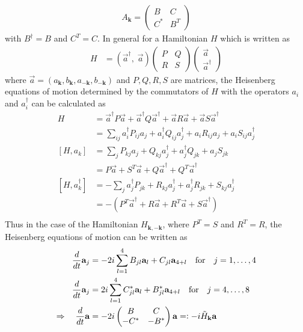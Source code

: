 \begin{align*}
    A_\mathbf{k} = \begin{pmatrix}
        B &C\\
        C^* & B^T
\end{pmatrix}
\end{align*}
with $B^\dagger=B$ and $C^T=C$. In general for a Hamiltonian $H$ which is written as
\begin{align*}
    H &= \left(\vec{a}^{\dagger},\;\vec{a} \right) \begin{pmatrix}
        P & Q\\
        R & S
    \end{pmatrix} \begin{pmatrix}\vec{a}\\\vec{a}^{\dagger} \end{pmatrix}
\end{align*}
where $\vec{a}=(a_\mathbf{k},b_\mathbf{k},a_{-\mathbf{k}},b_{-\mathbf{k}})$ and $P,Q,R,S$ are matrices, the Heisenberg equations of motion determined by the commutators of $H$ with the operators $a_i$ and $a_i^{\dagger}$ can be calculated as
\begin{align*}
H &= \vec{a}^{\dagger} P \vec{a} + \vec{a}^{\dagger} Q \vec{a}^{\dagger} 
    + \vec{a} R \vec{a} + \vec{a} S \vec{a}^{\dagger}\\
%
&= \sum_{ij} a_i^{\dagger} P_{ij} a_j + a_i^{\dagger} Q_{ij} a_j^{\dagger} 
  + a_i R_{ij} a_j + a_i S_{ij} a_j^{\dagger}\\
%
[H, a_k] &= \sum_j P_{kj} a_j + Q_{kj} a_j^{\dagger} + a_j^{\dagger} Q_{jk} + a_j S_{jk}\\
         &= P \vec{a} + S^{T} \vec{a} + Q \vec{a}^{\dagger} + Q^{T} \vec{a}^{\dagger}\\
%
[H, a_k^{\dagger}] &= -\sum_j a_j^{\dagger} P_{jk} + R_{kj} a_j^{\dagger} + a_j^{\dagger} R_{jk} + S_{kj} a_j^{\dagger}\\
                   &= -\left( P^{T} \vec{a}^{\dagger} + R \vec{a} + R^{T} \vec{a} + S \vec{a}^{\dagger} \right)\\
\end{align*}
Thus in the case of the Hamiltonian $H_{\mathbf{k},-\mathbf{k}}$, where $P^T=S$ and $R^T=R$, the Heisenberg equations of motion can be written as
\begin{align*}
    \frac{d}{dt} \mathbf{a}_j &= -2i \sum_{l=1}^4 B_{jl} \mathbf{a}_l + C_{jl} \mathbf{a}_{4+l} \quad\text{for}\quad j=1,\dots,4\\
    \frac{d}{dt} \mathbf{a}_j &= 2i \sum_{l=1}^4 C^*_{jl} \mathbf{a}_l + B^*_{jl} \mathbf{a}_{4+l} \quad\text{for}\quad j=4,\dots,8\\
    \Rightarrow\quad \frac{d}{dt} \mathbf{a} &= -2i \begin{pmatrix}
        B & C\\
        -C^* & -B^*
    \end{pmatrix} \mathbf{a}=\vcentcolon -i \tilde{H}_\mathbf{k} \mathbf{a}
\end{align*}

